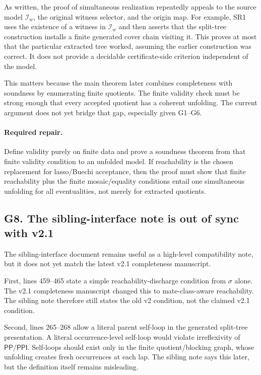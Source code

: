 \documentclass[11pt]{article}
\newcommand{\PP}{\mathsf{PP}}
\newcommand{\PPI}{\mathsf{PPI}}
\begin{document}
As written, the proof of simultaneous realization repeatedly appeals to the
source model \(\mathcal I_w\), the original witness selector, and the origin map.
For example, SR1 uses the existence of a witness in \(\mathcal I_w\) and then
asserts that the split-tree construction installs a finite generated cover chain
visiting it.  This proves at most that the particular extracted tree worked,
assuming the earlier construction was correct.  It does not provide a decidable
certificate-side criterion independent of the model.

This matters because the main theorem later combines completeness with
soundness by enumerating finite quotients.  The finite validity check must be
strong enough that every accepted quotient has a coherent unfolding.  The
current argument does not yet bridge that gap, especially given G1--G6.

\paragraph{Required repair.}
Define validity purely on finite data and prove a soundness theorem from that
finite validity condition to an unfolded model.  If reachability is the chosen
replacement for lasso/Buechi acceptance, then the proof must show that finite
reachability plus the finite mosaic/equality conditions entail one simultaneous
unfolding for all eventualities, not merely for extracted quotients.

\subsection{G8. The sibling-interface note is out of sync with v2.1}

The sibling-interface document remains useful as a high-level compatibility
note, but it does not yet match the latest v2.1 completeness manuscript.

First, lines 459--465 state a simple reachability-discharge condition from
\(\sigma\) alone.  The v2.1 completeness manuscript changed this to
mate-class-aware reachability.  The sibling note therefore still states the old
v2 condition, not the claimed v2.1 condition.

Second, lines 265--268 allow a literal parent self-loop in the generated
split-tree presentation.  A literal occurrence-level self-loop would violate
irreflexivity of \(\PP/\PPI\).  Self-loops should exist only in the finite
quotient/blocking graph, whose unfolding creates fresh occurrences at each lap.
The sibling note says this later, but the definition itself remains misleading.
\end{document}
